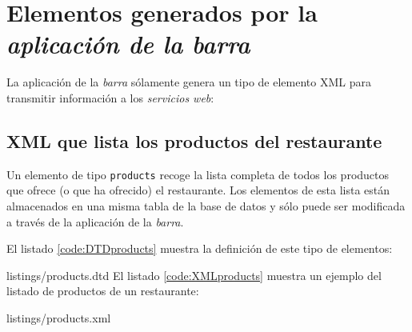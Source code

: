 \section{Elementos generados por la \emph{aplicación de la barra}}
La aplicación de la \emph{barra} sólamente genera un tipo de elemento
\acs{XML} para transmitir información a los \emph{servicios web}:
\subsection{\acs{XML} que lista los productos del restaurante}
Un elemento de tipo \texttt{products} recoge la lista completa de todos los
productos que ofrece (o que ha ofrecido) el restaurante. Los elementos de
esta lista están almacenados en una misma tabla de la base de datos y sólo
puede ser modificada a través de la aplicación de la \emph{barra}.

El listado \ref{code:DTDproducts} muestra la definición de este tipo de 
elementos:

{listings/products.dtd}
El listado \ref{code:XMLproducts} muestra un ejemplo del listado de productos
de un restaurante:

{listings/products.xml}

